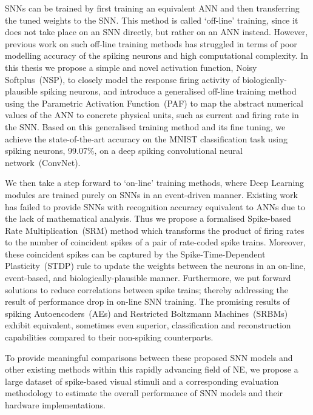 SNNs can be trained by first training an equivalent ANN and then transferring the tuned weights to the SNN.
This method is called `off-line' training, since it does not take place on an SNN directly, but rather on an ANN instead.
However, previous work on such off-line training methods has struggled in terms of poor modelling accuracy of the spiking neurons and high computational complexity.
In this thesis we propose a simple and novel activation function, Noisy Softplus~(NSP), to closely model the response firing activity of biologically-plausible spiking neurons,
and introduce a generalised off-line training method using the Parametric Activation Function~(PAF) to map the abstract numerical values of the ANN to concrete physical units, such as current and firing rate in the SNN.
Based on this generalised training method and its fine tuning, we achieve the state-of-the-art accuracy on the MNIST classification task using spiking neurons, 99.07\%, on a deep spiking convolutional neural network~(ConvNet).


We then take a step forward to `on-line' training methods, where Deep Learning modules are trained purely on SNNs in an event-driven manner.
Existing work has failed to provide SNNs with recognition accuracy equivalent to ANNs due to the lack of mathematical analysis. 
Thus we propose a formalised Spike-based Rate Multiplication~(SRM) method which transforms the product of firing rates to the number of coincident spikes of a pair of rate-coded spike trains.
Moreover, these coincident spikes can be captured by the Spike-Time-Dependent Plasticity~(STDP) rule to update the weights between the neurons in an on-line, event-based, and biologically-plausible manner.
Furthermore, we put forward solutions to reduce correlations between spike trains; thereby addressing the result of performance drop in on-line SNN training. 
The promising results of spiking Autoencoders~(AEs) and Restricted Boltzmann Machines~(SRBMs) exhibit equivalent, sometimes even superior, classification and reconstruction capabilities compared to their non-spiking counterparts.

To provide meaningful comparisons between these proposed SNN models and other existing methods within this rapidly advancing field of NE, we propose a large dataset of spike-based visual stimuli and a corresponding evaluation methodology to estimate the overall performance of SNN models and their hardware implementations.

